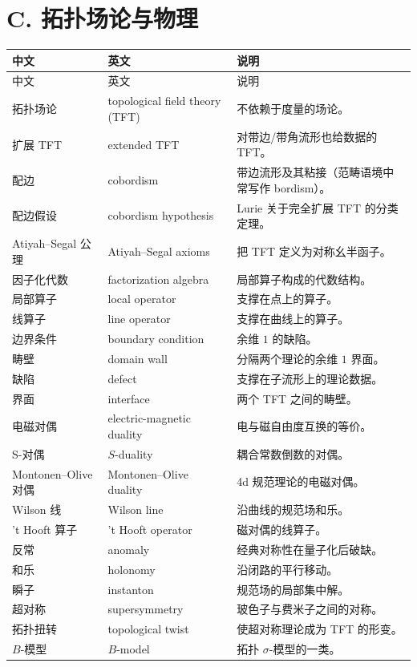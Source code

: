 \section*{C. 拓扑场论与物理}
\begin{longtable}{p{}p{}p{}}
\toprule
中文 & 英文 & 说明\\
\midrule
\endfirsthead
\toprule
中文 & 英文 & 说明\\
\midrule
\endhead
拓扑场论 & topological field theory (TFT) & 不依赖于度量的场论。\\
扩展 TFT & extended TFT & 对带边/带角流形也给数据的 TFT。\\
配边 & cobordism & 带边流形及其粘接（范畴语境中常写作 bordism）。\\
配边假设 & cobordism hypothesis & Lurie 关于完全扩展 TFT 的分类定理。\\
Atiyah--Segal 公理 & Atiyah--Segal axioms & 把 TFT 定义为对称幺半函子。\\
因子化代数 & factorization algebra & 局部算子构成的代数结构。\\
局部算子 & local operator & 支撑在点上的算子。\\
线算子 & line operator & 支撑在曲线上的算子。\\
边界条件 & boundary condition & 余维 $1$ 的缺陷。\\
畴壁 & domain wall & 分隔两个理论的余维 $1$ 界面。\\
缺陷 & defect & 支撑在子流形上的理论数据。\\
界面 & interface & 两个 TFT 之间的畴壁。\\
电磁对偶 & electric-magnetic duality & 电与磁自由度互换的等价。\\
S-对偶 & $S$-duality & 耦合常数倒数的对偶。\\
Montonen--Olive 对偶 & Montonen--Olive duality & 4d 规范理论的电磁对偶。\\
Wilson 线 & Wilson line & 沿曲线的规范场和乐。\\
't Hooft 算子 & 't Hooft operator & 磁对偶的线算子。\\
反常 & anomaly & 经典对称性在量子化后破缺。\\
和乐 & holonomy & 沿闭路的平行移动。\\
瞬子 & instanton & 规范场的局部集中解。\\
超对称 & supersymmetry & 玻色子与费米子之间的对称。\\
拓扑扭转 & topological twist & 使超对称理论成为 TFT 的形变。\\
$B$-模型 & $B$-model & 拓扑 $\sigma$-模型的一类。\\

\end{longtable}
